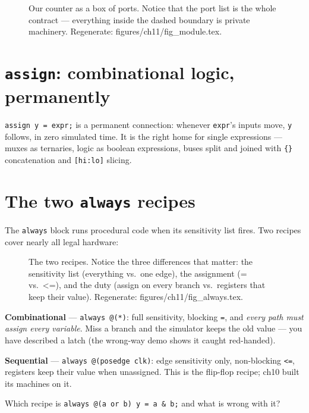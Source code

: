 \begin{figure}[htbp]
\centering

\caption{Our counter as a box of ports. Notice that the port list is the
whole contract --- everything inside the dashed boundary is private
machinery. Regenerate: \ttfamily figures/ch11/fig\_module.tex.}
\label{fig:module11}
\end{figure}

\section{\texttt{assign}: combinational logic, permanently}
\label{sec:assign}

\texttt{assign y = expr;} is a permanent connection: whenever \texttt{expr}'s inputs move, \texttt{y} follows,
in zero simulated time. It is the right home for single expressions
--- muxes as ternaries, logic as boolean expressions, buses split and
joined with \texttt{\{\}} concatenation and \texttt{[hi:lo]} slicing.

\section{The two \texttt{always} recipes}\label{sec:always}

The \texttt{always} block runs procedural
code when its sensitivity list fires. Two recipes cover nearly all
legal hardware:

\begin{figure}[htbp]
\centering

\caption{The two recipes. Notice the three differences that matter:
the sensitivity list (everything vs.\ one edge), the assignment
(= vs.\ <=), and the duty (assign on every branch vs.\ registers that
keep their value). Regenerate: \ttfamily figures/ch11/fig\_always.tex.}
\label{fig:always}
\end{figure}

\textbf{Combinational} --- \texttt{always @(*)}: full sensitivity,
blocking \texttt{=}, and \emph{every path must assign every variable}.
Miss a branch and the simulator keeps the old value --- you have
described a latch (the wrong-way demo shows it caught red-handed).

\textbf{Sequential} --- \texttt{always @(posedge clk)}: edge
sensitivity only, non-blocking \texttt{<=}, registers keep their value
when unassigned. This is the flip-flop recipe; ch10 built its machines
on it.

\begin{exercise}[easy]
Which recipe is \texttt{always @(a or b) y = a \& b;} and what is wrong
with it?
\end{exercise}

